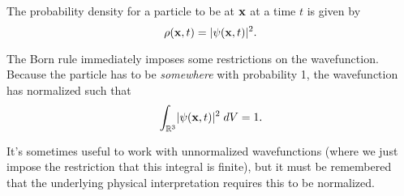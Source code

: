 \documentclass[a4paper]{scrartcl}
\begin{document}
\begin{law}
The probability density for a particle to be at $\mathbf{x}$ at a time $t$ is given by
$$
\rho(\mathbf{x}, t) = \lvert\psi(\mathbf{x}, t)\rvert^2.
$$
\end{law}

The Born rule immediately imposes some restrictions on the wavefunction. Because the particle has to be \emph{somewhere} with probability 1, the wavefunction has normalized such that 
$$
    \int_{\mathbb{R}^3} \lvert\psi(\mathbf{x}, t)\rvert^2 \; d V = 1.
$$

It's sometimes useful to work with unnormalized wavefunctions (where we just impose the restriction that this integral is finite), but it must be remembered that the underlying physical interpretation requires this to be normalized.
\end{document}
